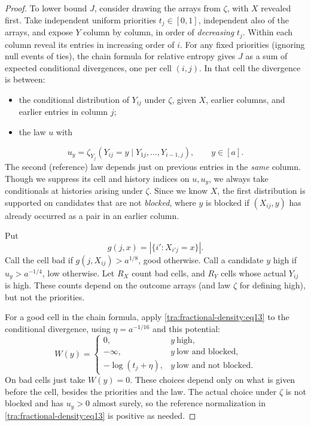 \begin{proof}
To lower bound \(J\), consider drawing the arrays from \(\zeta\), with \(X\) revealed first. Take independent uniform priorities \(t_j\in[0,1]\), independent also of the arrays, and expose \(Y\) column by column, in order of \emph{decreasing} \(t_j\). Within each column reveal its entries in increasing order of \(i\). For any fixed priorities (ignoring null events of ties), the chain formula for relative entropy gives \(J\) as a sum of expected conditional divergences, one per cell \((i,j)\). In that cell the divergence is between:
\begin{itemize}
\item the conditional distribution of \(Y_{ij}\) under \(\zeta\), given \(X\), earlier columns, and earlier entries in column \(j\);
\item the law \(u\) with
\end{itemize}
\[
 u_y=\zeta_{Y_j}(Y_{ij}=y\mid Y_{1j},\ldots,Y_{i-1,j}),\qquad y\in[a].
\]
The second (reference) law depends just on previous entries in the \emph{same} column. Though we suppress its cell and history indices on \(u,u_y\), we always take conditionals at histories arising under \(\zeta\). Since we know \(X\), the first distribution is supported on candidates that are not \emph{blocked}, where \(y\) is blocked if \((X_{ij},y)\) has already occurred as a pair in an earlier column.

Put
\[
 g(j,x)=|\{i': X_{i'j}=x\}|.
\]
Call the cell bad if \(g(j,X_{ij})>a^{1/8}\), good otherwise. Call a candidate \(y\) high if \(u_y>a^{-1/4}\), low otherwise. Let \(R_X\) count bad cells, and \(R_Y\) cells whose actual \(Y_{ij}\) is high. These counts depend on the outcome arrays (and law \(\zeta\) for defining high), but not the priorities.

\label{tra:fractional-density:low-candidate-potential}
For a good cell in the chain formula, apply \eqref{tra:fractional-density:eq13} to the conditional divergence, using \(\eta=a^{-1/16}\) and this potential:
\[
 W(y)=
 \begin{cases}
 0, & y\ \text{high},\\
 -\infty, & y\ \text{low and blocked},\\
 -\log(t_j+\eta), & y\ \text{low and not blocked}.
 \end{cases}
\]
On bad cells just take \(W(y)=0\). These choices depend only on what is given before the cell, besides the priorities and the law. The actual choice under \(\zeta\) is not blocked and has \(u_y>0\) almost surely, so the reference normalization in \eqref{tra:fractional-density:eq13} is positive as needed.


\end{proof}

